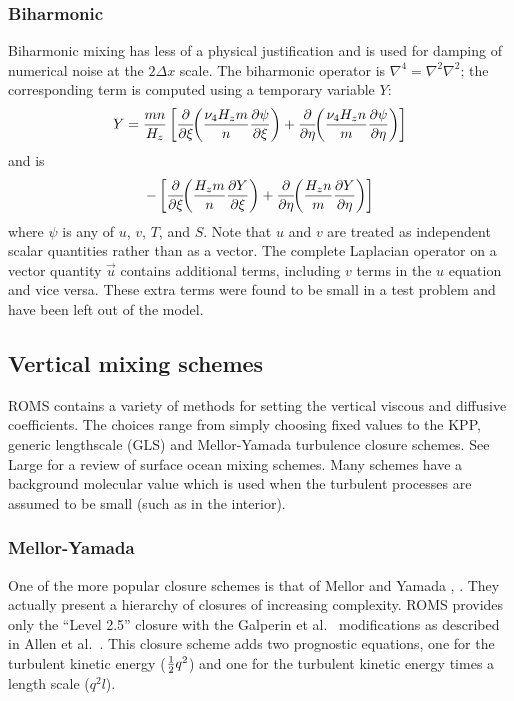\subsubsection{Biharmonic}
Biharmonic mixing has less of a physical justification and is used
for damping of numerical noise at the $2 \Delta x$ scale.
The biharmonic operator is $\nabla^4 = \nabla^2 \nabla^2$; the
corresponding term is computed using a temporary variable $Y$:
\begin{equation}
   Y =
   {mn \over H_z} \left[ 
   {\partial \over \partial \xi} \!\! \left( {\nu_4 H_zm \over n} 
   {\partial \psi \over \partial \xi} \right) +
   {\partial \over \partial \eta} \!\! \left( {\nu_4 H_zn \over m} 
   {\partial \psi \over \partial \eta} \right) \right]
\end{equation}
and is
\begin{equation}
   - \left[ 
   {\partial \over \partial \xi} \!\! \left( {H_zm \over n} 
   {\partial Y \over \partial \xi} \right) +
   {\partial \over \partial \eta} \!\! \left( {H_zn \over m} 
   {\partial Y \over \partial \eta} \right) \right]
\end{equation}
where $\psi$ is any of $u$, $v$, $T$, and $S$.  Note that
$u$ and $v$ are treated as independent scalar quantities rather than as
a vector.  The complete Laplacian operator on a vector quantity
$\vec{u}$ contains additional terms, including $v$ terms in the $u$
equation and vice versa.  These extra terms were found to be small in a
test problem and have been left out of the model.

\subsection{Vertical mixing schemes}
\label{Vmix}
ROMS contains a variety of methods for setting the vertical viscous and
diffusive coefficients. The choices range from simply choosing fixed
values to the KPP, generic lengthscale (GLS) and Mellor-Yamada turbulence
closure schemes.  See Large \cite{Large98} for a review of surface ocean
mixing schemes.  Many schemes have a background molecular value which
is used when the turbulent processes are assumed to be small (such as
in the interior).

\subsubsection{Mellor-Yamada}
One of the more popular closure schemes is that of Mellor and Yamada
\cite{Mellor74}, \cite{Mellor82}. They actually present a hierarchy of
closures of increasing complexity. ROMS provides only the
``Level 2.5'' closure with the Galperin et al.\ \cite{Galperin88}
modifications as described in Allen et al.\ \cite{Allen95}.
This closure scheme adds two prognostic equations, one
for the turbulent kinetic energy (${1 \over 2} q^2$) and one for the
turbulent kinetic energy times a length scale ($q^2l$).

